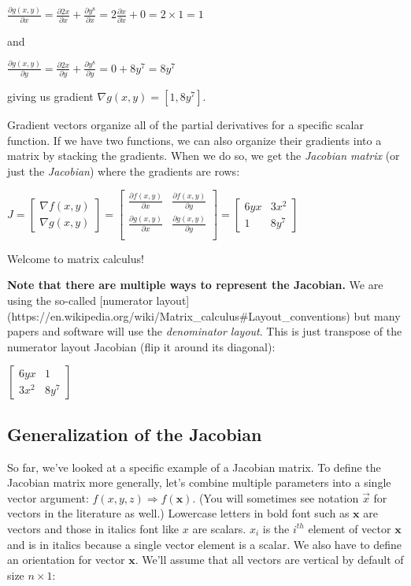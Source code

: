 \documentclass[11pt]{article}
\begin{document}
$\frac{\partial g(x,y)}{\partial x} = \frac{\partial 2x}{\partial x} + \frac{\partial y^8}{\partial x} = 2\frac{\partial x}{\partial x} + 0 = 2 \times 1 = 1$

and

$\frac{\partial g(x,y)}{\partial y} = \frac{\partial 2x}{\partial y} + \frac{\partial y^8}{\partial y} = 0 + 8y^7 = 8y^7$

giving us gradient $\nabla g(x,y) = [1, 8y^7]$.

Gradient vectors organize all of the partial derivatives for a specific scalar function. If we have two functions, we can also organize their gradients into a matrix by stacking the gradients. When we do so, we get the {\em Jacobian matrix} (or just the {\em Jacobian}) where the gradients are rows:

$J =
\begin{bmatrix}
	\nabla f(x,y)\\
	\nabla g(x,y)
\end{bmatrix} = \begin{bmatrix}
\frac{\partial f(x,y)}{\partial x} & \frac{\partial f(x,y)}{\partial y}\\
\frac{\partial g(x,y)}{\partial x} & \frac{\partial g(x,y)}{\partial y}\\
\end{bmatrix} = \begin{bmatrix}
	6yx & 3x^2\\
	1 & 8y^7
\end{bmatrix}
$

Welcome to matrix calculus!

{\bf Note that there are multiple ways to represent the Jacobian.} We are using the so-called [numerator layout](https://en.wikipedia.org/wiki/Matrix\_calculus\#Layout\_conventions) but many papers and software will use the {\em denominator layout}. This is just transpose of the numerator layout Jacobian (flip it around its diagonal):

$
\begin{bmatrix}
	6yx & 1\\
	3x^2 & 8y^7
\end{bmatrix}
$

\subsection{Generalization of the Jacobian}

So far, we've looked at a specific example of a Jacobian matrix. To define the Jacobian matrix more generally, let's combine multiple parameters into a single vector argument: $f(x,y,z) \Rightarrow f(\mathbf{x})$. (You will sometimes see notation $\vec{x}$  for vectors in the literature as well.) Lowercase letters in bold font such as $\mathbf{x}$ are vectors and those in italics font like $x$ are scalars. $x_i$ is the $i^{th}$ element of vector $\mathbf{x}$ and is in italics because a single vector element is a scalar. We also have to define an orientation for vector $\mathbf{x}$. We'll assume that all vectors are vertical by default of size $n \times 1$:
\end{document}
